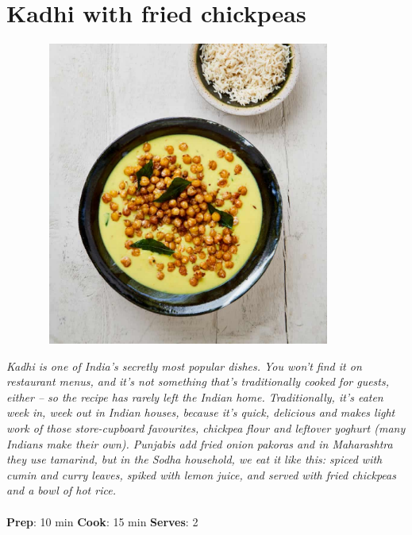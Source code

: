 \documentclass{book}
\begin{document}
\section{Kadhi with fried chickpeas}
\begin{figure}
\centering\includegraphics[width=10cm,height=10cm,keepaspectratio]{Recipe_Pictures/Kadhi_with_fried_chickpeas.png}
\end{figure}
\emph{Kadhi is one of India’s secretly most popular dishes. You won’t find it on restaurant menus, and it’s not something that’s traditionally cooked for guests, either – so the recipe has rarely left the Indian home. Traditionally, it’s eaten week in, week out in Indian houses, because it’s quick, delicious and makes light work of those store-cupboard favourites, chickpea flour and leftover yoghurt (many Indians make their own). Punjabis add fried onion pakoras and in Maharashtra they use tamarind, but in the Sodha household, we eat it like this: spiced with cumin and curry leaves, spiked with lemon juice, and served with fried chickpeas and a bowl of hot rice.}\\\\ 
\textbf{Prep}: 10 min
\textbf{Cook}: 15 min
\textbf{Serves}: 2
\end{document}
